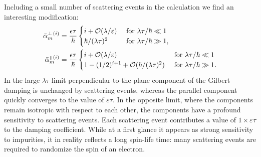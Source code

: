 Including a small number of scattering events in the calculation we find an interesting modification:
\begin{align}
	\label{eq:perpi}
    \bar{\alpha}_{m}^{\perp\,(i)}  & = \frac{\epsilon\tau}{\hbar}\begin{cases}
    i + \mathcal{O}(\lambda/\varepsilon)  & \text{ for }\lambda\tau/\hbar\ll1\\
    \hbar/(\lambda\tau)^2 & \text{ for }\lambda\tau/\hbar\gg1,
    \end{cases}\\
    \label{eq:parai}
    \bar{\alpha}_{m}^{{\scriptscriptstyle\parallel}\,(i)}  &  = \frac{\epsilon\tau}{\hbar}\begin{cases}
    i + \mathcal{O}(\lambda/\varepsilon)  & \text{ for }\lambda\tau/\hbar\ll1\\
    1-(1/2)^{i+1}+\mathcal{O}(\hbar/(\lambda\tau)^2) & \text{ for }\lambda\tau/\hbar\gg1.
    \end{cases}
\end{align}
In the large $\lambda\tau$ limit perpendicular-to-the-plane component of the Gilbert damping is unchanged by scattering events, whereas the parallel component quickly converges to the value of $\varepsilon\tau$. In the opposite limit, where the components remain isotropic with respect to each other, the components have a profound sensitivity to scattering events. Each scattering event contributes a value of $1\times\varepsilon\tau$ to the damping coefficient. While at a first glance it appears as strong sensitivity to impurities, it in reality reflects a long spin-life time: many scattering events are required to randomize the spin of an electron. 

